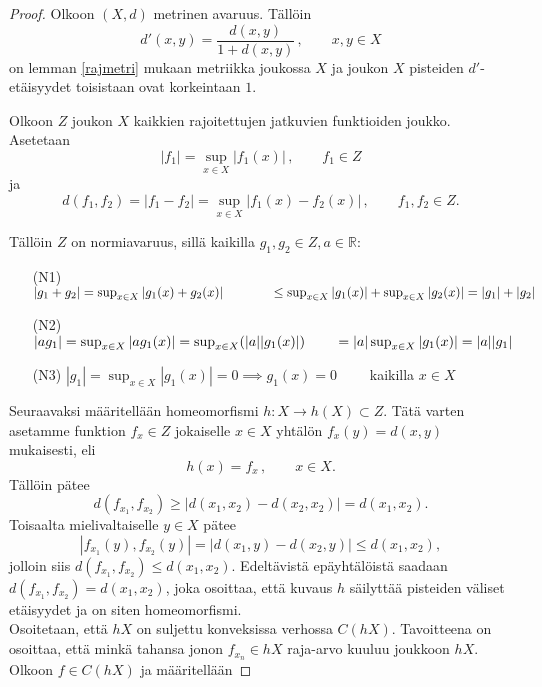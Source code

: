 \documentclass[12pt,a4paper,leqno]{report}
\newcommand{\R}{\mathbb{R}}
\theoremstyle{plain}
\theoremstyle{definition}
\theoremstyle{remark}
\begin{document}

\begin{proof} Olkoon $(X,d)$ metrinen avaruus. Tällöin 
$$d'(x,y)=\dfrac{d(x,y)}{1+d(x,y)} \, , \qquad x,y\in X$$
on lemman \ref{rajmetri} mukaan metriikka joukossa $X$ ja joukon $X$ pisteiden $d'$-etäisyydet toisistaan ovat korkeintaan $1$.

Olkoon $Z$ joukon $X$ kaikkien rajoitettujen jatkuvien funktioiden joukko. Asetetaan
$$|f_1|=\sup_{x\in X} |f_1(x)| \, , \qquad f_1\in Z$$
ja
$$d(f_1,f_2)=|f_1-f_2| = \sup_{x\in X} |f_1 (x)-f_2 (x)| \, , \qquad f_1, f_2 \in Z .$$

Tällöin $Z$ on normiavaruus, sillä kaikilla $g_1,g_2\in Z, a\in \R$:
\begin{itemize}
\item[(N1)] $|g_1+g_2|=\sup_{x\in X} |g_1(x)+g_2(x)|\\
\phantom{|g_1+g_2|} \leq \sup_{x\in X} |g_1(x)|+\sup_{x\in X} |g_2(x)|=|g_1|+|g_2|$
\item[(N2)] $|ag_1|=\sup_{x\in X} |ag_1(x)|=\sup_{x\in X} (|a||g_1(x)|)\\
\phantom{|a_{1ag}} =|a|\sup_{x\in X} |g_1(x)|=|a||g_1|$
\item[(N3)] $|g_1|=\sup_{x\in X} |g_1(x)|=0\implies g_1(x)=0\qquad$ kaikilla $ x\in X$
\end{itemize}
Seuraavaksi määritellään homeomorfismi $h\colon X\rightarrow h(X)\subset Z$. Tätä varten asetamme funktion $f_x\in Z$ jokaiselle $x\in X$ yhtälön $f_x (y)=d(x,y)$ mukaisesti, eli
$$h(x)=f_x\, ,\qquad x\in X. $$ 
Tällöin pätee 
$$d(f_{x_1} ,f_{x_2} ) \geq |d(x_1 , x_2 )-d(x_2 , x_2 )|=d(x_1 ,x_2 ).$$ 
Toisaalta mielivaltaiselle $y\in X$ pätee
$$|f_{x_1} (y), f_{x_2} (y)|=|d(x_1 ,y )-d(x_2 ,y)|\leq d(x_1 , x_2 ),$$
jolloin siis $d(f_{x_1},f_{x_2})\leq d(x_1 , x_2 )$. Edeltävistä epäyhtälöistä saadaan $d(f_{x_1},f_{x_2})= d(x_1 , x_2 )$, joka osoittaa, että kuvaus $h$ säilyttää pisteiden väliset etäisyydet ja on siten homeomorfismi.\\
Osoitetaan, että $hX$ on suljettu konveksissa verhossa $C(hX)$. Tavoitteena on osoittaa, että minkä tahansa jonon $f_{x_n}\in hX$ raja-arvo kuuluu joukkoon $ hX$. Olkoon $f\in C(hX)$ ja määritellään 

\end{proof}
\end{document}
